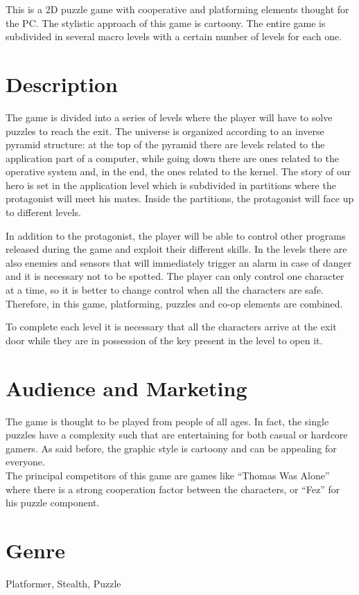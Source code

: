 \documentclass[12pt, a4paper]{report}
\begin{document}
This is a 2D puzzle game with cooperative and platforming elements thought for the PC. The stylistic approach of this game is cartoony. The entire game is subdivided in several macro levels with a certain number of levels for each one.

\section*{Description}
The game is divided into a series of levels where the player will have to solve puzzles to reach the exit. The universe is organized according to an inverse pyramid structure: at the top of the pyramid there are levels related to the application part of a computer, while going down there are ones related to the operative system and, in the end, the ones related to the kernel. The story of our hero is set in the application level which is subdivided in partitions where the protagonist will meet his mates. Inside the partitions, the protagonist will face up to different levels.

In addition to the protagonist, the player will be able to control other programs released during the game and exploit their different skills. In the levels there are also enemies and sensors that will immediately trigger an alarm in case of danger and it is necessary not to be spotted. The player can only control one character at a time, so it is better to change control when all the characters are safe. Therefore, in this game, platforming, puzzles and co-op elements are combined.

To complete each level it is necessary that all the characters arrive at the exit door while they are in possession of the key present in the level to open it.

\section*{Audience and Marketing}
The game is thought to be played from people of all ages. In fact, the single puzzles have a complexity such that are entertaining for both casual or hardcore gamers. As said before, the graphic style is cartoony and can be appealing for everyone.\\
The principal competitors of this game are games like “Thomas Was Alone” where there is a strong cooperation factor between the characters, or “Fez” for his puzzle component.

\section*{Genre}
Platformer, Stealth, Puzzle
\end{document}
